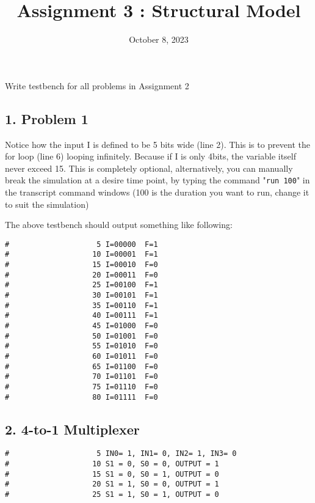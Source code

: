 \documentclass{vhdl-assignment}
\title{Assignment 3 : Structural Model}
\date{October 8, 2023}
\begin{document}
\maketitle
\thispagestyle{fancy}

\begin{problem}{Write testbench for all problems in Assignment 2}
    \subsection*{1. Problem 1}
    Notice how the input I is defined to be 5 bits wide (line 2).
    This is to prevent the for loop (line 6) looping infinitely.
    Because if I is only 4bits, the variable itself never exceed 15.
    This is completely optional, alternatively, you can manually break the simulation at a desire time point,
    by typing the command "\verb|run 100|" in the transcript command windows (100 is the duration you want to run, change it to suit the simulation) 
    
    The above testbench should output something like following:
\begin{lstlisting}[caption=Problems 1 Testbench Output]
#                    5 I=00000  F=1
#                   10 I=00001  F=1
#                   15 I=00010  F=0
#                   20 I=00011  F=0
#                   25 I=00100  F=1
#                   30 I=00101  F=1
#                   35 I=00110  F=1
#                   40 I=00111  F=1
#                   45 I=01000  F=0
#                   50 I=01001  F=0
#                   55 I=01010  F=0
#                   60 I=01011  F=0
#                   65 I=01100  F=0
#                   70 I=01101  F=0
#                   75 I=01110  F=0
#                   80 I=01111  F=0
\end{lstlisting}

    \subsection*{2. 4-to-1 Multiplexer}
\begin{lstlisting}[caption=4-to-1 Multiplexer Testbench Output]
#                    5 IN0= 1, IN1= 0, IN2= 1, IN3= 0
#                   10 S1 = 0, S0 = 0, OUTPUT = 1
#                   15 S1 = 0, S0 = 1, OUTPUT = 0
#                   20 S1 = 1, S0 = 0, OUTPUT = 1
#                   25 S1 = 1, S0 = 1, OUTPUT = 0
\end{lstlisting}


\end{problem}
\end{document}
